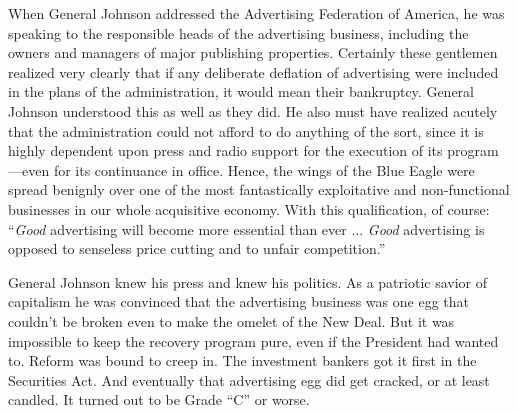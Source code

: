\documentclass[nohyper,openany,nobib]{tufte-book}
\begin{document}
\pagebreak When General Johnson addressed the Advertising Federation of America, he
was speaking to the responsible heads of the advertising business,
including the owners and managers of major publishing properties.
Certainly these gentlemen realized very clearly that if any deliberate
deflation of advertising were included in the plans of the
administration, it would mean their bankruptcy. General Johnson
understood this as well as they did. He also must have realized acutely
that the administration could not afford to do anything of the sort,
since it is highly dependent upon press and radio support for the
execution of its program---even for its continuance in office. Hence,
the wings of the Blue Eagle were spread benignly over one of the most
fantastically exploitative and non-functional businesses in our whole
acquisitive economy. With this qualification, of course: ``\emph{Good}
advertising will become more essential than ever ... \emph{Good}
advertising is opposed to senseless price cutting and to unfair
competition.''

General Johnson knew his press and knew his politics. As a patriotic
savior of capitalism he was convinced that the advertising business was
one egg that couldn't be broken even to make the omelet of the New Deal.
But it was impossible to keep the recovery program pure, even if the
President had wanted to. Reform was bound to creep in. The investment
bankers got it first in the Securities Act. And eventually that
advertising egg did get cracked, or at least candled. It turned out to
be Grade ``C'' or worse.
\end{document}
